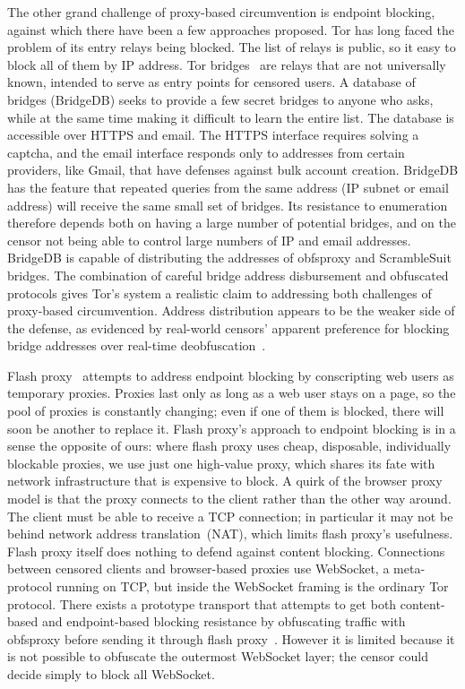 \documentclass{article}
\begin{document}
The other grand challenge of proxy-based circumvention is endpoint blocking,
against which there have been a few approaches proposed.
Tor has long faced the problem of its entry relays being blocked. The list of
relays is public, so it easy to block all of them by IP address. Tor
bridges~\cite{tor-blocking} are relays that are not universally known, intended
to serve as entry points for censored users. A database of bridges (BridgeDB) seeks to
provide a few secret bridges to anyone who asks, while at the same time making it
difficult to learn the entire list.
The database is accessible over HTTPS and email.
The HTTPS interface requires solving a captcha,
and the email interface responds only to addresses from certain providers, like Gmail,
that have defenses against bulk account creation.
BridgeDB has the feature that repeated queries from the same address
(IP subnet or email address) will receive the same small set of bridges.
Its resistance to enumeration therefore depends both on
having a large number of potential bridges,
and on the censor not being able to control large numbers of IP and email addresses.
BridgeDB is capable of distributing
the addresses of obfsproxy and ScrambleSuit bridges.
The combination
of careful bridge address disbursement and obfuscated protocols
gives Tor's system a realistic claim to addressing both challenges of proxy-based circumvention.
Address distribution appears to be the weaker side of the defense,
as evidenced by real-world censors' apparent preference for
blocking bridge addresses over real-time deobfuscation~\cite{foci12-winter}.

Flash proxy~\cite{flashproxy} attempts to address endpoint blocking by
conscripting web users as temporary proxies. Proxies last only as long as a web
user stays on a page, so the pool of proxies is constantly changing;
even if one of them is blocked, there will soon be another to replace it.
Flash proxy's approach to endpoint blocking is in a sense
the opposite of ours: where flash proxy uses cheap, disposable, individually blockable proxies,
we use just one high-value proxy, which shares its fate with network
infrastructure that is expensive to block.
A quirk of the browser proxy model is that the proxy connects to the client rather than the other way around.
The client must be able to receive a TCP connection; in particular it
may not be behind network address translation~(NAT), which limits flash proxy's usefulness.
Flash proxy itself does nothing to defend against content blocking.
Connections between censored clients and browser-based proxies use
WebSocket, a meta-protocol running on TCP,
but inside the WebSocket framing is the ordinary Tor protocol.
There exists a prototype transport that attempts to get both
content-based and endpoint-based blocking resistance by obfuscating traffic
with obfsproxy before sending it through flash proxy~\cite{obfs-flash}.
However it is limited because it is not
possible to obfuscate the outermost WebSocket layer;
the censor could decide simply to block all WebSocket.
\end{document}
